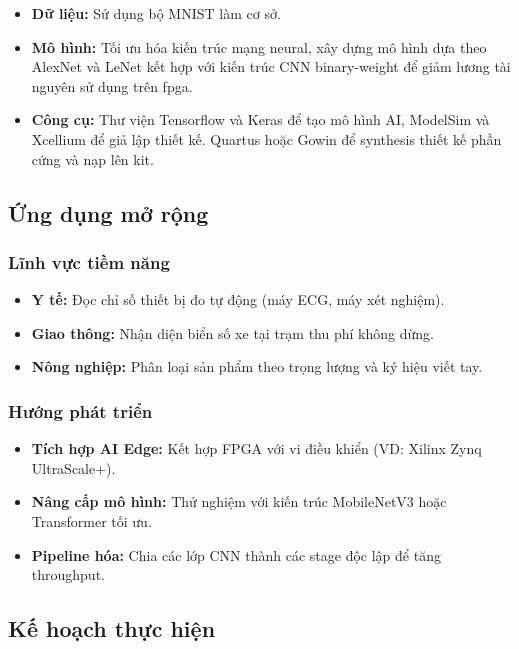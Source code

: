 \begin{itemize}
    \item \textbf{Dữ liệu:} Sử dụng bộ MNIST làm cơ sở.
    \item \textbf{Mô hình:} Tối ưu hóa kiến trúc mạng neural, xây dựng mô hình dựa theo AlexNet và LeNet kết hợp với kiến trúc CNN binary-weight để giảm lương tài nguyên sử dụng trên fpga.
    \item \textbf{Công cụ:} Thư viện Tensorflow và Keras để tạo mô hình AI, ModelSim và Xcellium để giả lập thiết kế. Quartus hoặc Gowin để synthesis thiết kế phần cứng và nạp lên kit.
\end{itemize}

\subsection{Ứng dụng mở rộng}
\subsubsection{Lĩnh vực tiềm năng}
\begin{itemize}
    \item \textbf{Y tế:} Đọc chỉ số thiết bị đo tự động (máy ECG, máy xét nghiệm).
    \item \textbf{Giao thông:} Nhận diện biển số xe tại trạm thu phí không dừng.
    \item \textbf{Nông nghiệp:} Phân loại sản phẩm theo trọng lượng và ký hiệu viết tay.
\end{itemize}
\subsubsection{Hướng phát triển}
\begin{itemize}
    \item \textbf{Tích hợp AI Edge:} Kết hợp FPGA với vi điều khiển (VD: Xilinx Zynq UltraScale+).
    \item \textbf{Nâng cấp mô hình:} Thử nghiệm với kiến trúc MobileNetV3 hoặc Transformer tối ưu.
    \item \textbf{Pipeline hóa:} Chia các lớp CNN thành các stage độc lập để tăng throughput.
\end{itemize}

\subsection{Kế hoạch thực hiện}

